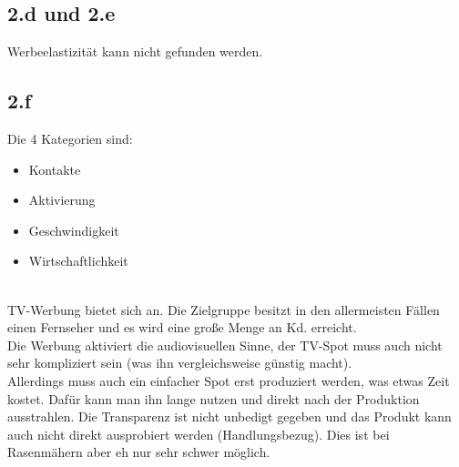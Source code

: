 \subsection*{2.d und 2.e}
    Werbeelastizität kann nicht gefunden werden.

\subsection*{2.f}
    Die 4 Kategorien sind:
    \begin{itemize}
        \item Kontakte
        \item Aktivierung
        \item Geschwindigkeit
        \item Wirtschaftlichkeit
    \end{itemize}
    \ \\
    TV-Werbung bietet sich an. Die Zielgruppe besitzt in den allermeisten Fällen einen Fernseher und es wird eine große Menge an Kd. erreicht. \\
    Die Werbung aktiviert die audiovisuellen Sinne, der TV-Spot muss auch nicht sehr kompliziert sein (was ihn vergleichsweise günstig macht). \\
    Allerdings muss auch ein einfacher Spot erst produziert werden, was etwas Zeit kostet. Dafür kann man ihn lange nutzen und direkt nach der Produktion ausstrahlen.
    Die Transparenz ist nicht unbedigt gegeben und das Produkt kann auch nicht direkt ausprobiert werden (Handlungsbezug). Dies ist bei Rasenmähern aber eh nur sehr schwer möglich. \\
    \ \\
    
